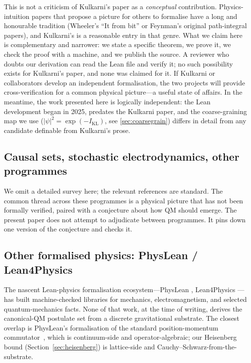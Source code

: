 \documentclass[11pt,a4paper,twoside]{article}
\theoremstyle{definition}
\newcommand{\KL}{I_{\mathrm{KL}}}
\begin{document}
This is not a criticism of Kulkarni's paper as a \emph{conceptual}
contribution. Physics-intuition papers that propose a picture for
others to formalise have a long and honourable tradition (Wheeler's
``It from bit'' or Feynman's original path-integral papers), and
Kulkarni's is a reasonable entry in that genre. What we claim here is
complementary and narrower: we state a specific theorem, we prove it,
we check the proof with a machine, and we publish the source. A
reviewer who doubts our derivation can read the Lean file and verify
it; no such possibility exists for Kulkarni's paper, and none was
claimed for it. If Kulkarni or collaborators develop an independent
formalisation, the two projects will provide cross-verification for a
common physical picture---a useful state of affairs. In the meantime,
the work presented here is logically independent: the Lean development
began in 2025, predates the Kulkarni paper, and the coarse-graining
map we use ($|\psi|^{2}=\exp(-\KL)$, see \cref{sec:coarsegrain}) differs
in detail from any candidate definable from Kulkarni's prose.

\subsection{Causal sets, stochastic electrodynamics, other programmes}\label{sec:prior-other}

We omit a detailed survey here; the relevant references
\cite{BombelliLeeMeyerSorkin1987,dePenaCetto1996,Markopoulou2008} are
standard. The common thread across these programmes is a physical
picture that has not been formally verified, paired with a conjecture
about how QM should emerge. The present paper does not attempt to
adjudicate between programmes. It pins down one version of the
conjecture and checks it.

\subsection{Other formalised physics: PhysLean / Lean4Physics}\label{sec:prior-physlean}

The nascent Lean-physics formalisation ecosystem---PhysLean
\cite{ToobySmith2024,ToobySmith2025,PhysLean2025}, Lean4Physics
\cite{Lean4Physics2024}---has built machine-checked libraries for
mechanics, electromagnetism, and selected quantum-mechanics facts.
None of that work, at the time of writing, derives the canonical-QM
postulate set from a discrete gravitational substrate. The closest
overlap is PhysLean's formalisation of the standard
position-momentum commutator~\cite{ToobySmith2025}, which is
continuum-side and operator-algebraic; our Heisenberg bound
(Section~\ref{sec:heisenberg}) is lattice-side and
Cauchy--Schwarz-from-the-substrate.
\end{document}
